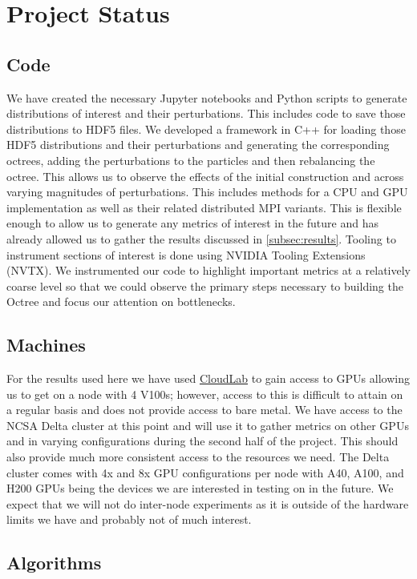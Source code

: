 \section{Project Status}

\subsection{Code}
We have created the necessary Jupyter notebooks and Python scripts to generate distributions of interest and their perturbations. This includes code to save those distributions to HDF5 files. We developed a framework in C++ for loading those HDF5 distributions and their perturbations and generating the corresponding octrees, adding the perturbations to the particles and then rebalancing the octree. This allows us to observe the effects of the initial construction and across varying magnitudes of perturbations. This includes methods for a CPU and GPU implementation as well as their related distributed MPI variants. This is flexible enough to allow us to generate any metrics of interest in the future and has already allowed us to gather the results discussed in \ref{subsec:results}. Tooling to instrument sections of interest is done using NVIDIA Tooling Extensions (NVTX). We instrumented our code to highlight important metrics at a relatively coarse level so that we could observe the primary steps necessary to building the Octree and focus our attention on bottlenecks. 

\subsection{Machines}
For the results used here we have used \href{https://www.cloudlab.us/}{CloudLab} to gain access to GPUs allowing us to get on a node with 4 V100s; however, access to this is difficult to attain on a regular basis and does not provide access to bare metal. We have access to the NCSA Delta cluster at this point and will use it to gather metrics on other GPUs and in varying configurations during the second half of the project. This should also provide much more consistent access to the resources we need. The Delta cluster comes with 4x and 8x GPU configurations per node with A40, A100, and H200 GPUs being the devices we are interested in testing on in the future. We expect that we will not do inter-node experiments as it is outside of the hardware limits we have and probably not of much interest. 

\subsection{Algorithms}


